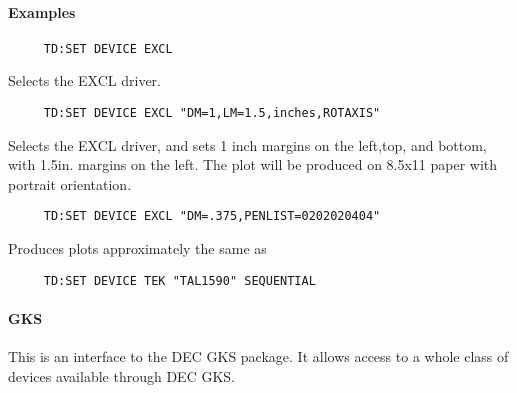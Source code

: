 \paragraph{Examples}
\begin{verbatim}
     TD:SET DEVICE EXCL 
\end{verbatim}
Selects the EXCL driver.  
\begin{verbatim}
     TD:SET DEVICE EXCL "DM=1,LM=1.5,inches,ROTAXIS" 
\end{verbatim}
Selects  the  EXCL driver, and sets 1 inch margins on the left,top,
and bottom, with 1.5in.  margins on the left.   The  plot  will  be
produced on 8.5x11 paper with portrait orientation.  
\begin{verbatim}
     TD:SET DEVICE EXCL "DM=.375,PENLIST=0202020404" 
\end{verbatim}
Produces plots approximately the same as 
\begin{verbatim}
     TD:SET DEVICE TEK "TAL1590" SEQUENTIAL 
\end{verbatim}
\paragraph{GKS}
This is an interface to the DEC GKS package.  
It  allows  access  to a whole class of devices available through DEC
GKS.  
